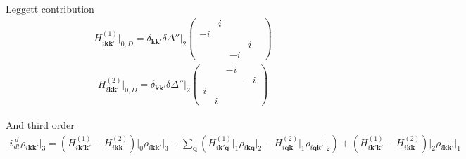 \documentclass[a4paper]{article}
\begin{document}
Leggett contribution
\begin{eqnarray*}
  H_{i\mathbf{kk'}}^{(1)}\big|_{0,D}
  =
  \delta_{\mathbf{kk'}} \delta \Delta''\big|_2
  \begin{pmatrix}
     & i & & \\
    -i &  & & \\
    &&  & i \\
    && -i &  & 
  \end{pmatrix}
\end{eqnarray*}
\begin{eqnarray*}
  H_{i\mathbf{kk'}}^{(2)}\big|_{0,D}
  =
  \delta_{\mathbf{kk'}} \delta \Delta''\big|_2
  \begin{pmatrix}
     && -i & \\
    &  && -i \\
    i &&  & \\
    & i && 
  \end{pmatrix}
\end{eqnarray*}

And third order
\begin{eqnarray*}
i\frac{d}{dt} \rho_{i\mathbf{k}\mathbf{k}'}\big|_3
  =
  \left( 
    H_{i\mathbf{k'k'}}^{(1)} - H_{i\mathbf{kk} }^{(2)} 
  \right)\bigg|_0
    \rho_{i\mathbf{kk'}}\big|_3
	+
  \sum_{\mathbf{q}}^{}
  \left( 
    H_{i\mathbf{k'q}}^{(1)}\big|_1 \rho_{i\mathbf{kq }}\big|_2 -
    H_{i\mathbf{qk} }^{(2)}\big|_1 \rho_{i\mathbf{qk'}}\big|_2
  \right)
	+
  \left( 
    H_{i\mathbf{k'k'}}^{(1)} - H_{i\mathbf{kk} }^{(2)} 
  \right)\bigg|_2
    \rho_{i\mathbf{kk'}}\big|_1
\end{eqnarray*}
\end{document}
